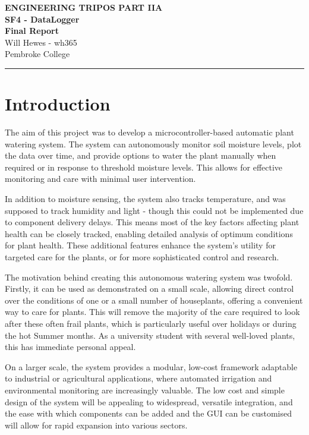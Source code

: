 \documentclass[a4paper,11pt]{article}
\renewcommand{\maketitle}{
    \begin{center}
        \LARGE \textbf{ENGINEERING TRIPOS PART IIA} \\[0.5em]
        \Large \textbf{SF4 - DataLogger} \\[0.5em]
        \textbf{Final Report} \\[1.5em]
        \vspace{-1em}
        \small Will Hewes - wh365 \\ 
        Pembroke College \\ 
        \vspace{0.5em}
    \end{center}
}
\begin{document}
% 
\maketitle
\hrule
\tableofcontents
\newpage
{} \setcounter{page}{1}

\section{Introduction}
\label{sec:introduction}

The aim of this project was to develop a microcontroller-based 
automatic plant watering system.
The system can autonomously monitor soil moisture levels, 
plot the data over time, and provide options to water the plant
manually when required or in response to threshold moisture levels.
This allows for effective monitoring and care with minimal user intervention.

In addition to moisture sensing, the system also tracks temperature, 
and was supposed to track humidity and light -
though this could not be implemented due to component delivery delays.
This means most of the key factors affecting plant health
can be closely tracked, enabling detailed analysis of
optimum conditions for plant health.
These additional features enhance the system's utility for targeted care for the plants,
or for more sophisticated control and research.

The motivation behind creating this autonomous watering system was twofold. 
Firstly, it can be used as demonstrated on a small scale,
allowing direct control over the conditions of one 
or a small number of houseplants,
offering a convenient way to care for plants.
This will remove the majority of the care required
to look after these often frail plants,
which is particularly useful over holidays or 
during the hot Summer months.
As a university student with several well-loved plants,
this has immediate personal appeal.

On a larger scale, the system provides a modular, 
low-cost framework adaptable to industrial or agricultural applications, 
where automated irrigation and environmental monitoring are increasingly valuable.
The low cost and simple design of the system will be appealing 
to widespread, versatile integration,
and the ease with which components can be added
and the GUI can be customised will allow for rapid expansion into various sectors.
\end{document}
